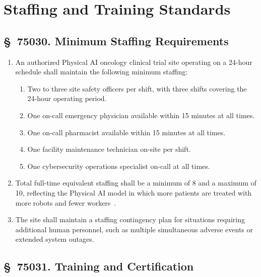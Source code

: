 \section{Staffing and Training Standards}

\subsection{\S~75030. Minimum Staffing Requirements}

\begin{enumerate}[label=(\alph*)]
\item An authorized Physical AI oncology clinical trial site operating on a
  24-hour schedule shall maintain the following minimum staffing:
  \begin{enumerate}[label=(\arabic*)]
  \item Two to three site safety officers per shift, with three shifts covering
    the 24-hour operating period.
  \item One on-call emergency physician available within 15 minutes at all
    times.
  \item One on-call pharmacist available within 15 minutes at all times.
  \item One facility maintenance technician on-site per shift.
  \item One cybersecurity operations specialist on-call at all times.
  \end{enumerate}

\item Total full-time equivalent staffing shall be a minimum of 8 and a maximum
  of 10, reflecting the Physical AI model in which more patients are treated
  with more robots and fewer workers~\cite{sitespec2026}.

\item The site shall maintain a staffing contingency plan for situations
  requiring additional human personnel, such as multiple simultaneous
  adverse events or extended system outages.
\end{enumerate}

\subsection{\S~75031. Training and Certification}

